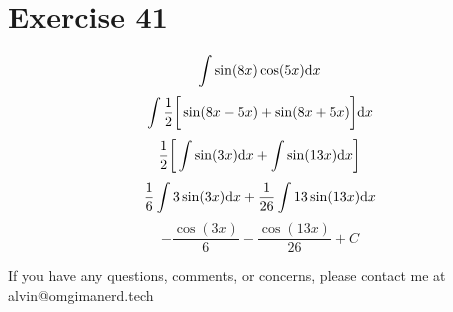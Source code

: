 \documentclass{math}
\begin{document}
\section*{Exercise 41}
\[ \int{\sin(8x)\cos(5x)\mathrm{d}{x}} \]
\[ \int{\frac{1}{2}\bigg[\sin(8x-5x)+\sin(8x+5x)\bigg]\mathrm{d}{x}} \]
\[ \frac{1}{2}\bigg[\int{\sin(3x)\mathrm{d}{x}}+\int{\sin(13x)\mathrm{d}{x}}\bigg] \]
\[ \frac{1}{6}\int{3\sin(3x)\mathrm{d}{x}}+\frac{1}{26}\int{13\sin(13x)\mathrm{d}{x}} \]
\[ -\frac{\cos(3x)}{6}-\frac{\cos(13x)}{26}+C \]

\begin{center}
  If you have any questions, comments, or concerns, please contact me at
  alvin@omgimanerd.tech
\end{center}
\end{document}
